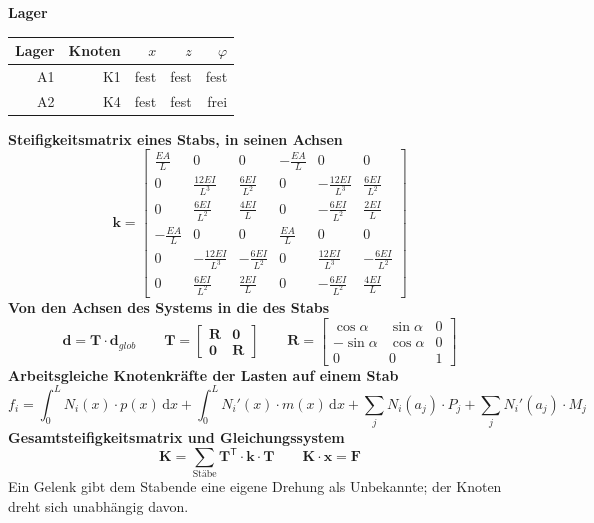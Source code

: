 \documentclass[11pt,a4paper]{article}
\begin{document}
\noindent\textbf{Lager}
\begin{longtable}{rrrrr}
\hline
Lager & Knoten & $x$ & $z$ & $\varphi$ \\
\hline
\endhead
A1 & K1 & fest & fest & fest \\
A2 & K4 & fest & fest & frei \\
\hline
\end{longtable}
\noindent\textbf{Steifigkeitsmatrix eines Stabs, in seinen Achsen}
\begin{equation*}
\mathbf{k} = \begin{bmatrix} \frac{EA}{L} & 0 & 0 & -\frac{EA}{L} & 0 & 0 \\ 0 & \frac{12EI}{L^3} & \frac{6EI}{L^2} & 0 & -\frac{12EI}{L^3} & \frac{6EI}{L^2} \\ 0 & \frac{6EI}{L^2} & \frac{4EI}{L} & 0 & -\frac{6EI}{L^2} & \frac{2EI}{L} \\ -\frac{EA}{L} & 0 & 0 & \frac{EA}{L} & 0 & 0 \\ 0 & -\frac{12EI}{L^3} & -\frac{6EI}{L^2} & 0 & \frac{12EI}{L^3} & -\frac{6EI}{L^2} \\ 0 & \frac{6EI}{L^2} & \frac{2EI}{L} & 0 & -\frac{6EI}{L^2} & \frac{4EI}{L} \end{bmatrix}
\end{equation*}
\noindent\textbf{Von den Achsen des Systems in die des Stabs}
\begin{equation*}
\mathbf{d} = \mathbf{T} \cdot \mathbf{d}_{glob} \qquad \mathbf{T} = \begin{bmatrix} \mathbf{R} & \mathbf{0} \\ \mathbf{0} & \mathbf{R} \end{bmatrix} \qquad \mathbf{R} = \begin{bmatrix} \cos\alpha & \sin\alpha & 0 \\ -\sin\alpha & \cos\alpha & 0 \\ 0 & 0 & 1 \end{bmatrix}
\end{equation*}
\noindent\textbf{Arbeitsgleiche Knotenkräfte der Lasten auf einem Stab}
\begin{equation*}
f_i = \int_0^L N_i(x) \cdot p(x)\,\mathrm{d}x + \int_0^L N_i'(x) \cdot m(x)\,\mathrm{d}x + \sum_j N_i(a_j) \cdot P_j + \sum_j N_i'(a_j) \cdot M_j
\end{equation*}
\noindent\textbf{Gesamtsteifigkeitsmatrix und Gleichungssystem}
\begin{equation*}
\mathbf{K} = \sum_{\text{Stäbe}} \mathbf{T}^{\mathsf{T}} \cdot \mathbf{k} \cdot \mathbf{T} \qquad \mathbf{K} \cdot \mathbf{x} = \mathbf{F}
\end{equation*}
Ein Gelenk gibt dem Stabende eine eigene Drehung als Unbekannte; der Knoten dreht sich unabhängig davon.
\end{document}
